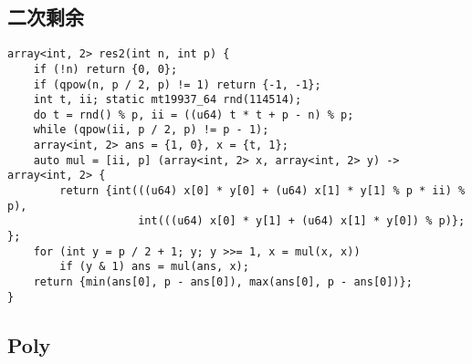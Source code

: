 \documentclass[a4paper,landscape,twocolumn]{ctexart}
\begin{document}
\subsection{二次剩余}

\begin{lstlisting}
array<int, 2> res2(int n, int p) {
	if (!n) return {0, 0};
	if (qpow(n, p / 2, p) != 1) return {-1, -1};
	int t, ii; static mt19937_64 rnd(114514);
	do t = rnd() % p, ii = ((u64) t * t + p - n) % p;
	while (qpow(ii, p / 2, p) != p - 1);
	array<int, 2> ans = {1, 0}, x = {t, 1};
	auto mul = [ii, p] (array<int, 2> x, array<int, 2> y) -> array<int, 2> {
		return {int(((u64) x[0] * y[0] + (u64) x[1] * y[1] % p * ii) % p),
					int(((u64) x[0] * y[1] + (u64) x[1] * y[0]) % p)}; };
	for (int y = p / 2 + 1; y; y >>= 1, x = mul(x, x))
		if (y & 1) ans = mul(ans, x);
	return {min(ans[0], p - ans[0]), max(ans[0], p - ans[0])};
}
\end{lstlisting}

\subsection{Poly}
\end{document}
